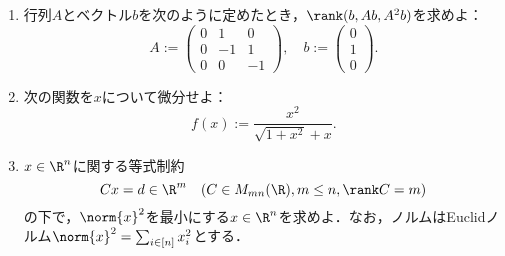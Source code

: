 \documentclass[uplatex,dvipdfmx]{jsarticle}
\begin{document}
\begin{tcolorbox}[colframe=ForestGreen, colback=ForestGreen!10!white,breakable,colbacktitle=ForestGreen!40!white,coltitle=black,fonttitle=\bfseries\sffamily,
    title=第１問]
    \begin{enumerate}
        \item 行列$A$とベクトル$b$を次のように定めたとき，$\rank(b,Ab,A^2b)$を求めよ：
        \[A:=\begin{pmatrix}0&1&0\\0&-1&1\\0&0&-1\end{pmatrix},\quad b:=\begin{pmatrix}0\\1\\0\end{pmatrix}.\]
        \item 次の関数を$x$について微分せよ：
        \[f(x):=\frac{x^2}{\sqrt{1+x^2}+x}.\]
        \item $x\in\R^n$に関する等式制約\[Cx=d\in\R^m\quad(C\in M_{mn}(\R),m\le n,\rank C=m)\]の下で，$\norm{x}^2$を最小にする$x\in\R^n$を求めよ．なお，ノルムはEuclidノルム$\norm{x}^2=\sum_{i\in[n]}x_i^2$とする．
    \end{enumerate}
\end{tcolorbox}
\end{document}

